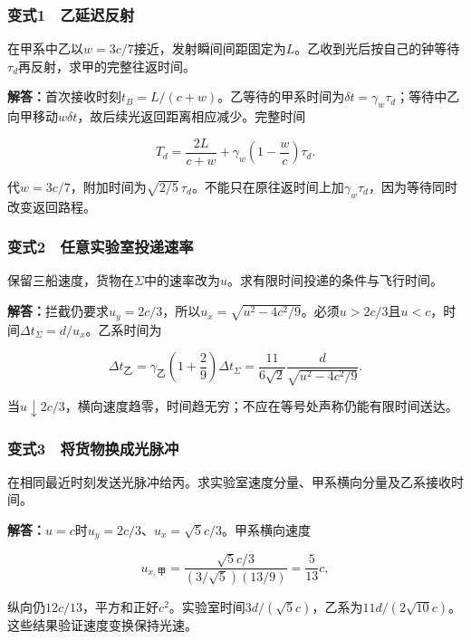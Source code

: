 \documentclass[12pt,a4paper,fontset=fandol]{ctexart}
\begin{document}
\subsubsection{变式1　乙延迟反射}\label{ux53d8ux5f0f1-ux4e59ux5ef6ux8fdfux53cdux5c04}

在甲系中乙以\(w=3c/7\)接近，发射瞬间间距固定为\(L\)。乙收到光后按自己的钟等待\(\tau_d\)再反射，求甲的完整往返时间。

\textbf{解答：}首次接收时刻\(t_B=L/(c+w)\)。乙等待的甲系时间为\(\delta t=\gamma_w\tau_d\)；等待中乙向甲移动\(w\delta t\)，故后续光返回距离相应减少。完整时间

\[
T_d=\frac{2L}{c+w}
+\gamma_w\left(1-\frac wc\right)\tau_d.
\]

代\(w=3c/7\)，附加时间为\(\sqrt{2/5}\,\tau_d\)。不能只在原往返时间上加\(\gamma_w\tau_d\)，因为等待同时改变返回路程。

\subsubsection{变式2　任意实验室投递速率}\label{ux53d8ux5f0f2-ux4efbux610fux5b9eux9a8cux5ba4ux6295ux9012ux901fux7387}

保留三船速度，货物在\(\Sigma\)中的速率改为\(u\)。求有限时间投递的条件与飞行时间。

\textbf{解答：}拦截仍要求\(u_y=2c/3\)，所以\(u_x=\sqrt{u^2-4c^2/9}\)。必须\(u>2c/3\)且\(u<c\)，时间\(\Delta t_\Sigma=d/u_x\)。乙系时间为

\[
\Delta t_\text{乙}
=\gamma_\text{乙}\left(1+\frac29\right)\Delta t_\Sigma
=\frac{11}{6\sqrt2}\frac d{\sqrt{u^2-4c^2/9}}.
\]

当\(u\downarrow2c/3\)，横向速度趋零，时间趋无穷；不应在等号处声称仍能有限时间送达。

\subsubsection{变式3　将货物换成光脉冲}\label{ux53d8ux5f0f3-ux5c06ux8d27ux7269ux6362ux6210ux5149ux8109ux51b2}

在相同最近时刻发送光脉冲给丙。求实验室速度分量、甲系横向分量及乙系接收时间。

\textbf{解答：}\(u=c\)时\(u_y=2c/3\)、\(u_x=\sqrt5c/3\)。甲系横向速度

\[
u_{x,\text{甲}}
=\frac{\sqrt5c/3}{(3/\sqrt5)(13/9)}
=\frac5{13}c,
\]

纵向仍\(12c/13\)，平方和正好\(c^2\)。实验室时间\(3d/(\sqrt5c)\)，乙系为\(11d/(2\sqrt{10}c)\)。这些结果验证速度变换保持光速。
\end{document}
